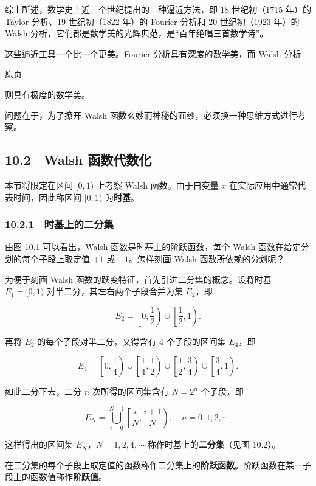 \documentclass[
  10pt,
  fontset=fandol]{ctexart}
\begin{document}
综上所述，数学史上近三个世纪提出的三种逼近方法，即 18 世纪初（1715 年）的 Taylor 分析、19 世纪初（1822 年）的 Fourier 分析和 20 世纪初（1923 年）的 Walsh 分析，它们都是数学美的光辉典范，是``百年绝唱三首数学诗''。

这些逼近工具一个比一个更美。Fourier 分析具有深度的数学美，而 Walsh 分析

\href{../../source-images/pdf-264.jpeg}{原页}

则具有极度的数学美。

问题在于，为了撩开 Walsh 函数玄妙而神秘的面纱，必须换一种思维方式进行考察。

\subsection{10.2　Walsh 函数代数化}\label{walsh-ux51fdux6570ux4ee3ux6570ux5316}

本节将限定在区间 \([0,1)\) 上考察 Walsh 函数。由于自变量 \(x\) 在实际应用中通常代表时间，因此称区间 \([0,1)\) 为\textbf{时基}。

\subsubsection{10.2.1　时基上的二分集}\label{ux65f6ux57faux4e0aux7684ux4e8cux5206ux96c6}

由图 10.1 可以看出，Walsh 函数是时基上的阶跃函数，每个 Walsh 函数在给定分划的每个子段上取定值 \(+1\) 或 \(-1\)。怎样刻画 Walsh 函数所依赖的分划呢？

为便于刻画 Walsh 函数的跃变特征，首先引进二分集的概念。设将时基 \(E_1=[0,1)\) 对半二分，其左右两个子段合并为集 \(E_2\)，即

\[
E_2=\left[0,\frac12\right)\cup\left[\frac12,1\right).
\]

再将 \(E_2\) 的每个子段对半二分，又得含有 4 个子段的区间集 \(E_4\)，即

\[
E_4=\left[0,\frac14\right)\cup\left[\frac14,\frac12\right)\cup\left[\frac12,\frac34\right)\cup\left[\frac34,1\right).
\]

如此二分下去，二分 \(n\) 次所得的区间集含有 \(N=2^n\) 个子段，即

\[
E_N=\bigcup_{i=0}^{N-1}\left[\frac{i}{N},\frac{i+1}{N}\right),\quad n=0,1,2,\cdots.
\]

这样得出的区间集 \(E_N\)，\(N=1,2,4,\cdots\) 称作时基上的\textbf{二分集}（见图 10.2）。

在二分集的每个子段上取定值的函数称作二分集上的\textbf{阶跃函数}。阶跃函数在某一子段上的函数值称作\textbf{阶跃值}。
\end{document}

